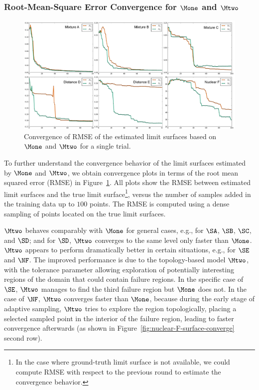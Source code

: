 \subsubsection{Root-Mean-Square Error Convergence for $\protect\Mone$ and $\protect\Mtwo$}

\begin{figure}[!ht]
\centering
\includegraphics[width=1.0\textwidth]{figs/chap5/RMSE-convergence.pdf}
\caption{Convergence of RMSE of the estimated limit surfaces based on $\protect\Mone$ and $\protect\Mtwo$ for a single trial.}
\label{fig:RMSE-convergence}
\end{figure}

To further understand the convergence behavior of the limit surfaces estimated by $\Mone$ and $\Mtwo$, we obtain convergence plots in terms of the root mean squared error (RMSE) in Figure~\ref{fig:RMSE-convergence}.
%
All plots show the RMSE between estimated limit surfaces and the true limit surface\footnote{In the case where ground-truth limit surface is not available, we could compute RMSE with respect to the previous round to estimate the convergence behavior.}, versus the number of samples added in the training data up to $100$ points.
%
The RMSE is computed using a dense sampling of points located on the true limit surfaces.

$\Mtwo$ behaves comparably with $\Mone$ for general cases, e.g., for $\SA$, $\SB$, $\SC$, and $\SD$; and for $\SD$, $\Mtwo$ converges to the same level only faster than $\Mone$.
%
$\Mtwo$ appears to perform dramatically better in certain situations, e.g., for $\SE$ and $\NF$.
%
The improved performance is due to the topology-based model $\Mtwo$, with the tolerance parameter allowing exploration of potentially interesting regions of the domain that could contain failure regions.
%
In the specific case of $\SE$, $\Mtwo$ manages to find the third failure region but $\Mone$ does not.
%
In the case of $\NF$, $\Mtwo$ converges faster than $\Mone$, because during the early stage of adaptive sampling, $\Mtwo$ tries to explore the region topologically, placing a selected sampled point in the interior of the failure region, leading to faster convergence afterwards (as shown in Figure~\ref{fig:nuclear-F-surface-converge} second row).

